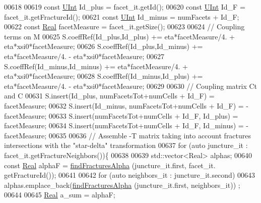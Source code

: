 \begin{DoxyCode}
00618                 
00619                 \textcolor{keyword}{const} \hyperlink{namespaceFVCode3D_a4bf7e328c75d0fd504050d040ebe9eda}{UInt} Id\_plus         = facet\_it.getId();
00620                 \textcolor{keyword}{const} \hyperlink{namespaceFVCode3D_a4bf7e328c75d0fd504050d040ebe9eda}{UInt} Id\_F            = facet\_it.getFractureId();
00621                 \textcolor{keyword}{const} \hyperlink{namespaceFVCode3D_a4bf7e328c75d0fd504050d040ebe9eda}{UInt} Id\_minus        = numFacets + Id\_F;
00622                 \textcolor{keyword}{const} \hyperlink{namespaceFVCode3D_a40c1f5588a248569d80aa5f867080e83}{Real} facetMeasure    = facet\_it.getSize();
00623                 
00624                 \textcolor{comment}{// Coupling terms on M}
00625                 S.coeffRef(Id\_plus,Id\_plus)    +=   eta*facetMeasure/4. + eta*xsi0*facetMeasure;
00626                 S.coeffRef(Id\_plus,Id\_minus)   +=   eta*facetMeasure/4. - eta*xsi0*facetMeasure;
00627                 S.coeffRef(Id\_minus,Id\_minus)  +=   eta*facetMeasure/4. + eta*xsi0*facetMeasure;
00628                 S.coeffRef(Id\_minus,Id\_plus)   +=   eta*facetMeasure/4. - eta*xsi0*facetMeasure;
00629                 
00630                 \textcolor{comment}{// Coupling matrix Ct and C}
00631                 S.insert(Id\_plus, numFacetsTot+numCells + Id\_F)     =  facetMeasure;
00632                 S.insert(Id\_minus, numFacetsTot+numCells + Id\_F)    = -facetMeasure;
00633                 S.insert(numFacetsTot+numCells + Id\_F, Id\_plus)     =  facetMeasure;
00634                 S.insert(numFacetsTot+numCells + Id\_F, Id\_minus)    = -facetMeasure;
00635         
00636                 \textcolor{comment}{// Assemble -T matrix taking into account fractures intersections with the "star-delta"
       transformation}
00637         \textcolor{keywordflow}{for} (\textcolor{keyword}{auto} juncture\_it : facet\_it.getFractureNeighbors())\{
00638                         
00639             std::vector<Real> alphas;
00640             \textcolor{keyword}{const} \hyperlink{namespaceFVCode3D_a40c1f5588a248569d80aa5f867080e83}{Real} alphaF = \hyperlink{classFVCode3D_1_1StiffMatrix_a53ce514c7a4c784061b5339350e00995}{findFracturesAlpha} (juncture\_it.first, facet\_it.
      getFractureId());
00641 
00642             \textcolor{keywordflow}{for} (\textcolor{keyword}{auto} neighbors\_it : juncture\_it.second)
00643                 alphas.emplace\_back(\hyperlink{classFVCode3D_1_1StiffMatrix_a53ce514c7a4c784061b5339350e00995}{findFracturesAlpha} (juncture\_it.first, neighbors\_it))
      ;
00644 
00645             \hyperlink{namespaceFVCode3D_a40c1f5588a248569d80aa5f867080e83}{Real} a\_sum = alphaF;

\end{DoxyCode}
